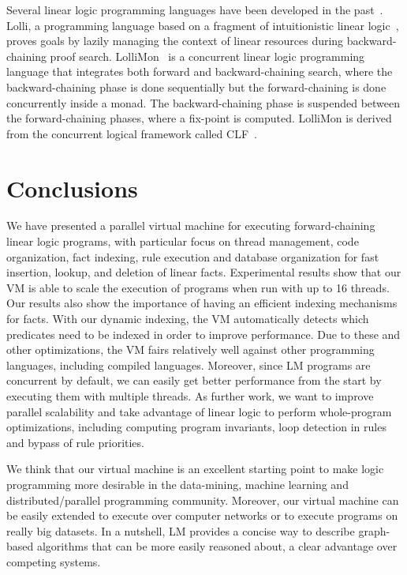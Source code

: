 \documentclass{sigplanconf}
\begin{document}
Several linear logic programming languages have been developed in the past~\cite{Miller85anoverview}.
Lolli, a programming language based on a fragment of intuitionistic linear logic~\cite{Hodas94logicprogramming}, 
proves goals by lazily managing the context of linear resources during backward-chaining proof search.
LolliMon~\cite{Lopez:2005:MCL:1069774.1069778} is a concurrent linear logic programming language that integrates
both forward and backward-chaining search, where the backward-chaining phase is done sequentially but
the forward-chaining is done concurrently inside a monad. The backward-chaining phase is suspended
between the forward-chaining phases, where a fix-point is computed.
LolliMon is derived from the concurrent logical framework called CLF~\cite{Watkins:2004uq}. 
\makeatletter{}\section{Conclusions}

We have presented a parallel virtual machine for executing
forward-chaining linear logic programs, with particular focus on
thread management, code organization, fact indexing, rule execution
and database organization for fast insertion, lookup, and deletion of
linear facts. Experimental results show that our VM is able to scale
the execution of programs when run with up to 16 threads.
Our results also show the importance of having an efficient indexing mechanisms
for facts. With our dynamic indexing, the VM automatically detects which predicates
need to be indexed in order to improve performance.
Due to these and other optimizations, the VM fairs relatively well against other programming languages, including
compiled languages. Moreover, since LM programs are
concurrent by default, we can easily get better performance from the
start by executing them with multiple threads.
As further work, we want to improve parallel scalability and
take advantage of linear logic to perform whole-program
optimizations, including computing program invariants, loop detection
in rules and bypass of rule priorities.

We think that our virtual machine is an excellent starting point to make
logic programming more desirable in the data-mining, machine learning and
distributed/parallel programming community. Moreover, our virtual machine can
be easily extended to execute over computer networks or to execute programs on really big datasets.
In a nutshell, LM provides a concise way to describe
graph-based algorithms that can be more easily reasoned about, a clear advantage over
competing systems.
 
\end{document}
